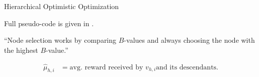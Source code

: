 \begin{algorithm}
  \caption{Hierarchical Optimistic Optimization}\label{alg:hooShort}
\end{algorithm}

Full pseudo-code is given in .

``Node selection works by comparing $B$-values and always choosing the
node with the highest $B$-value.''

\begin{align*}
  \hat{\mu}_{h,i} &= \text{avg. reward received by } v_{h,i} \text{
    and its descendants.}\\
\end{align*}

